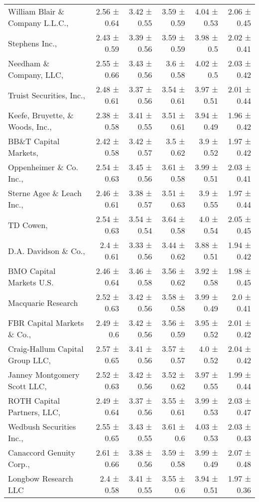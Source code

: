 \begin{tabular}{lrrrrr}
William Blair \& Company L.L.C.,  & 2.56 ± 0.64 & 3.42 ± 0.55 & 3.59 ± 0.59 & 4.04 ± 0.53 & 2.06 ± 0.45 \\
Stephens Inc.,  & 2.43 ± 0.59 & 3.39 ± 0.56 & 3.59 ± 0.59 & 3.98 ± 0.5 & 2.02 ± 0.41 \\
Needham \& Company, LLC,  & 2.55 ± 0.66 & 3.43 ± 0.56 & 3.6 ± 0.58 & 4.02 ± 0.5 & 2.03 ± 0.42 \\
Truist Securities, Inc.,  & 2.48 ± 0.61 & 3.37 ± 0.56 & 3.54 ± 0.61 & 3.97 ± 0.51 & 2.01 ± 0.44 \\
Keefe, Bruyette, \& Woods, Inc.,  & 2.38 ± 0.58 & 3.41 ± 0.55 & 3.51 ± 0.61 & 3.94 ± 0.49 & 1.96 ± 0.42 \\
BB\&T Capital Markets,  & 2.42 ± 0.58 & 3.42 ± 0.57 & 3.5 ± 0.62 & 3.9 ± 0.52 & 1.97 ± 0.42 \\
Oppenheimer \& Co. Inc.,  & 2.54 ± 0.63 & 3.45 ± 0.56 & 3.61 ± 0.58 & 3.99 ± 0.51 & 2.03 ± 0.41 \\
Sterne Agee \& Leach Inc.,  & 2.46 ± 0.61 & 3.38 ± 0.57 & 3.51 ± 0.63 & 3.9 ± 0.55 & 1.97 ± 0.44 \\
TD Cowen,  & 2.54 ± 0.63 & 3.54 ± 0.54 & 3.64 ± 0.58 & 4.0 ± 0.54 & 2.05 ± 0.45 \\
D.A. Davidson \& Co.,  & 2.4 ± 0.61 & 3.33 ± 0.56 & 3.44 ± 0.62 & 3.88 ± 0.51 & 1.94 ± 0.42 \\
BMO Capital Markets U.S. & 2.46 ± 0.64 & 3.46 ± 0.58 & 3.56 ± 0.62 & 3.92 ± 0.58 & 1.98 ± 0.45 \\
Macquarie Research & 2.52 ± 0.63 & 3.42 ± 0.56 & 3.58 ± 0.58 & 3.99 ± 0.49 & 2.0 ± 0.41 \\
FBR Capital Markets \& Co.,  & 2.49 ± 0.6 & 3.42 ± 0.56 & 3.56 ± 0.59 & 3.95 ± 0.52 & 2.01 ± 0.42 \\
Craig-Hallum Capital Group LLC,  & 2.57 ± 0.65 & 3.41 ± 0.56 & 3.57 ± 0.57 & 4.0 ± 0.52 & 2.04 ± 0.42 \\
Janney Montgomery Scott LLC,  & 2.52 ± 0.63 & 3.42 ± 0.56 & 3.52 ± 0.62 & 3.97 ± 0.55 & 1.99 ± 0.44 \\
ROTH Capital Partners, LLC,  & 2.49 ± 0.64 & 3.37 ± 0.56 & 3.55 ± 0.61 & 3.99 ± 0.53 & 2.03 ± 0.47 \\
Wedbush Securities Inc.,  & 2.55 ± 0.65 & 3.43 ± 0.55 & 3.61 ± 0.6 & 4.03 ± 0.53 & 2.03 ± 0.43 \\
Canaccord Genuity Corp.,  & 2.61 ± 0.66 & 3.38 ± 0.56 & 3.59 ± 0.58 & 3.99 ± 0.49 & 2.07 ± 0.48 \\
Longbow Research LLC & 2.4 ± 0.58 & 3.41 ± 0.55 & 3.55 ± 0.6 & 3.94 ± 0.51 & 1.97 ± 0.36 \\

\end{tabular}
